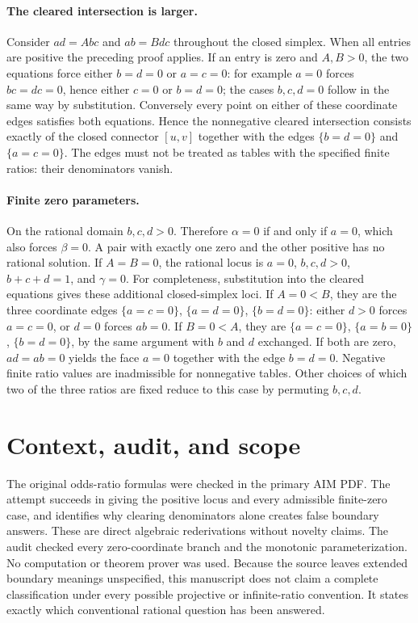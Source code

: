 \documentclass[11pt]{article}
\begin{document}
\paragraph{The cleared intersection is larger.}
Consider $ad=Abc$ and $ab=Bdc$ throughout the closed simplex.
When all entries are positive the preceding proof applies. If an entry is
zero and $A,B>0$, the two equations force either $b=d=0$ or $a=c=0$:
for example $a=0$ forces $bc=dc=0$, hence either $c=0$ or $b=d=0$;
the cases $b,c,d=0$ follow in the same way by substitution.
Conversely every point on either of these coordinate edges satisfies both
equations. Hence the nonnegative cleared intersection consists exactly of
the closed connector $[u,v]$ together with the edges $\{b=d=0\}$ and
$\{a=c=0\}$. The edges must not be treated as tables with the specified
finite ratios: their denominators vanish.

\paragraph{Finite zero parameters.}
On the rational domain $b,c,d>0$. Therefore $\alpha=0$ if and only if
$a=0$, which also forces $\beta=0$. A pair with exactly one zero and the
other positive has no rational solution. If $A=B=0$, the rational locus
is $a=0$, $b,c,d>0$, $b+c+d=1$, and $\gamma=0$.
For completeness, substitution into the cleared equations gives these
additional closed-simplex loci. If $A=0<B$, they are the three coordinate
edges $\{a=c=0\}$, $\{a=d=0\}$, $\{b=d=0\}$: either $d>0$ forces
$a=c=0$, or $d=0$ forces $ab=0$. If $B=0<A$, they are
$\{a=c=0\}$, $\{a=b=0\}$, $\{b=d=0\}$, by the same argument with
$b$ and $d$ exchanged. If both are zero, $ad=ab=0$ yields the face
$a=0$ together with the edge $b=d=0$. Negative finite ratio values are
inadmissible for nonnegative tables. Other choices of which two of the
three ratios are fixed reduce to this case by permuting $b,c,d$.

\section{Context, audit, and scope}
The original odds-ratio formulas were checked in the primary AIM PDF.
The attempt succeeds in giving the positive locus and every admissible
finite-zero case, and identifies why clearing denominators alone creates
false boundary answers. These are direct algebraic rederivations without
novelty claims. The audit checked every zero-coordinate branch and the
monotonic parameterization. No computation or theorem prover was used.
Because the source leaves extended boundary meanings unspecified, this
manuscript does not claim a complete classification under every possible
projective or infinite-ratio convention. It states exactly which
conventional rational question has been answered.
\end{document}
